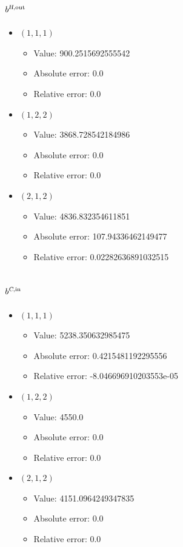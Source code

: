 \documentclass{article}%
\begin{document}
\subsection{$b^{\textsl{H},\text{out}}$}%
\begin{itemize}%
	\item $(1, 1, 1)$%
	\begin{itemize}%
		\item Value: 900.2515692555542%
		\item Absolute error: 0.0%
		\item Relative error: 0.0%
	\end{itemize}%
	\item $(1, 2, 2)$%
	\begin{itemize}%
		\item Value: 3868.728542184986%
		\item Absolute error: 0.0%
		\item Relative error: 0.0%
	\end{itemize}%
	\item $(2, 1, 2)$%
	\begin{itemize}%
		\item Value: 4836.832354611851%
		\item Absolute error: 107.94336462149477%
		\item Relative error: 0.02282636891032515%
	\end{itemize}%
\end{itemize}%
\subsection{$b^{\textsl{C},\text{in}}$}%
\begin{itemize}%
	\item $(1, 1, 1)$%
	\begin{itemize}%
		\item Value: 5238.350632985475%
		\item Absolute error: 0.4215481192295556%
		\item Relative error: -8.046696910203553e-05%
	\end{itemize}%
	\item $(1, 2, 2)$%
	\begin{itemize}%
		\item Value: 4550.0%
		\item Absolute error: 0.0%
		\item Relative error: 0.0%
	\end{itemize}%
	\item $(2, 1, 2)$%
	\begin{itemize}%
		\item Value: 4151.0964249347835%
		\item Absolute error: 0.0%
		\item Relative error: 0.0%
	\end{itemize}%
\end{itemize}%
\end{document}
